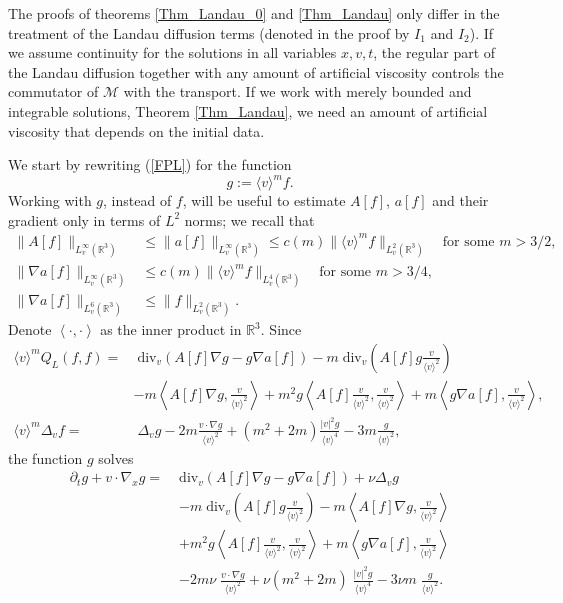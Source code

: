 \documentclass[11pt,american, reqno]{amsart}
\numberwithin{equation}{section}
\newcommand{\R}{\mathbb R}
\newcommand{\1}{\mathds{1}}
\newcommand{\nn}{\nonumber}
\newcommand{\vint}[1]{\left\langle#1\right\rangle}
\numberwithin{equation}{section}
\begin{document}
The proofs of theorems \ref{Thm_Landau_0} and \ref{Thm_Landau} only differ in the treatment of the Landau diffusion terms (denoted in the proof by $I_1$ and $I_2$). If we assume continuity for the solutions in all variables $x,v,t$,  the regular part of the Landau diffusion together with any amount of artificial viscosity controls the commutator of $\mathcal{M}$ with the transport. If we work with merely bounded and integrable solutions, Theorem \ref{Thm_Landau}, we need an amount of artificial viscosity that depends on the initial data. 


We start by rewriting (\ref{FPL}) for the function 
$$g := \langle v \rangle ^m f.$$
Working with $g$, instead of $f$, will be useful to estimate $A[f]$, $a[f]$ and their gradient only in terms of $L^2$ norms; we recall that  
\begin{align}\label{A_sup}
\| A[f]\|_{L^\infty_v(\mathbb{R}^3)} & \le \| a[f]\|_{L^\infty_v(\mathbb{R}^3)}  \le c(m)  \|   \langle v \rangle^{m}f\|_{L^2_v(\mathbb{R}^3)} \quad \textrm{for some $m>3/2$, } \\
\| \nabla a [f]\|_{L^\infty_v(\mathbb{R}^3)}&  \le c(m) \|   \langle v \rangle^{m}f\|_{L^4_v(\mathbb{R}^3)} \quad \textrm{for some $m>3/4$, } \label{nablaA_sup}\\
\| \nabla a [f]\|_{L^6_v(\mathbb{R}^3)} & \le   \| f\|_{L^2_v(\mathbb{R}^3)}.\label{nablaa_L6} 
\end{align}
Denote $\vint{\cdot, \cdot}$ as the inner product in $\R^3$. Since 
\begin{align*} 
 \langle v \rangle ^m  Q_L ( f,f) = &\; \textrm{div}_v \left( A[f] \nabla g - g \nabla a[f]\right) -m\; \textrm{div}_v \left( A[f]g \frac{v}{ \langle v \rangle ^2}\right)\\
 &  - m \left  \langle A[f]   \nabla g ,  \frac{v}{ \langle v \rangle ^2}\right  \rangle +m^2 g \left \langle A[f]  \frac{v}{ \langle v \rangle ^2}  ,  \frac{v}{ \langle v \rangle ^2}\right  \rangle + m \left \langle g \nabla a[f],  \frac{v}{ \langle v \rangle ^2}\right  \rangle,\\
 \langle v \rangle ^m \Delta_v f = &\; \Delta_v g - 2m \frac{v \cdot \nabla g }{\langle v \rangle ^2} + (m^2+2m)\frac{|v|^2g }{\langle v \rangle ^4} -3m \frac{ g }{\langle v \rangle ^2},
\end{align*}
the function $g$ solves
\begin{align}\label{FPLg}
\partial_t g + v \cdot \nabla_x g = \;&\textrm{div}_v \left( A[f] \nabla g - g \nabla a[f]\right) +\nu \Delta_v g \nn
\\
&-m\; \textrm{div}_v \left( A[f]g \frac{v}{ \langle v \rangle ^2}\right) - m \left  \langle A[f]   \nabla g ,  \frac{v}{ \langle v \rangle ^2}\right  \rangle \nonumber \\
& +m^2 g \left \langle A[f]  \frac{v}{ \langle v \rangle ^2}  ,  \frac{v}{ \langle v \rangle ^2}\right  \rangle + m \left \langle g \nabla a[f],  \frac{v}{ \langle v \rangle ^2}\right  \rangle \nonumber  
\\
&- 2m \nu  \;\frac{v \cdot \nabla g }{\langle v \rangle ^2} +\nu  (m^2+2m)\; \frac{|v|^2g }{\langle v \rangle ^4} -3\nu m \; \frac{ g }{\langle v \rangle ^2}.
\end{align}
\end{document}
